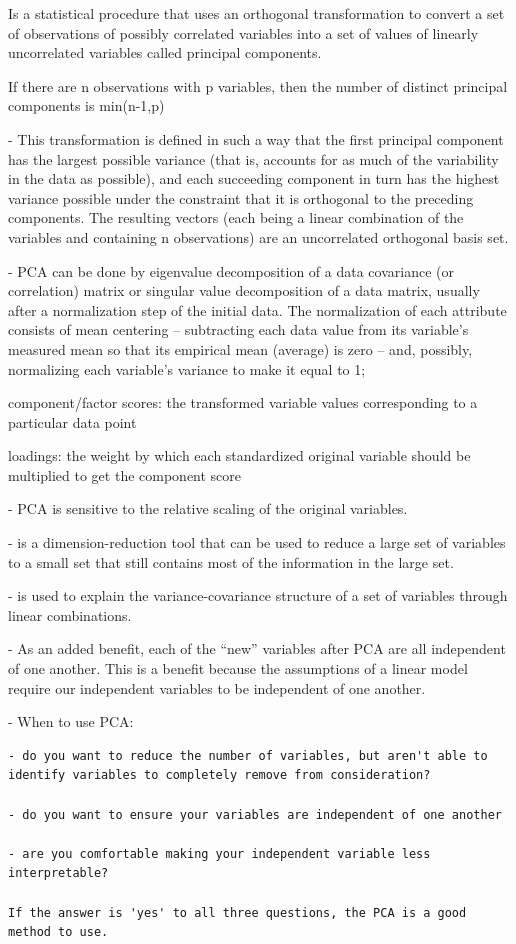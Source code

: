 \documentclass[
]{book}
\begin{document}
Is a statistical procedure that uses an orthogonal transformation to convert a set of observations of possibly correlated variables into a set of values of linearly uncorrelated variables called principal components.

If there are n observations with p variables, then the number of distinct principal components is min(n-1,p)

- This transformation is defined in such a way that the first principal component has the largest possible variance (that is, accounts for as much of the variability in the data as possible), and each succeeding component in turn has the highest variance possible under the constraint that it is orthogonal to the preceding components. The resulting vectors (each being a linear combination of the variables and containing n observations) are an uncorrelated orthogonal basis set.

- PCA can be done by eigenvalue decomposition of a data covariance (or correlation) matrix or singular value decomposition of a data matrix, usually after a normalization step of the initial data. The normalization of each attribute consists of mean centering -- subtracting each data value from its variable's measured mean so that its empirical mean (average) is zero -- and, possibly, normalizing each variable's variance to make it equal to 1;

component/factor scores: the transformed variable values corresponding to a particular data point

loadings: the weight by which each standardized original variable should be multiplied to get the component score

- PCA is sensitive to the relative scaling of the original variables.

- is a dimension-reduction tool that can be used to reduce a large set of variables to a small set that still contains most of the information in the large set.

- is used to explain the variance-covariance structure of a set of variables through linear combinations.

- As an added benefit, each of the ``new'' variables after PCA are all independent of one another. This is a benefit because the assumptions of a linear model require our independent variables to be independent of one another.

- When to use PCA:

\begin{verbatim}
- do you want to reduce the number of variables, but aren't able to identify variables to completely remove from consideration?

- do you want to ensure your variables are independent of one another

- are you comfortable making your independent variable less interpretable?

If the answer is 'yes' to all three questions, the PCA is a good method to use.
\end{verbatim}
\end{document}
